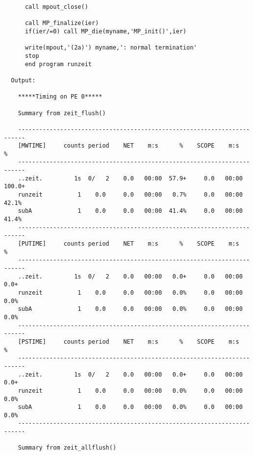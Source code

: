 \begin{verbatim}
      call mpout_close()

      call MP_finalize(ier)
      if(ier/=0) call MP_die(myname,'MP_init()',ier)

      write(mpout,'(2a)') myname,': normal termination'
      stop
      end program runzeit

  Output:

    *****Timing on PE 0*****

    Summary from zeit_flush()

    ------------------------------------------------------------------------
    [MWTIME]     counts period    NET    m:s      %    SCOPE    m:s      %
    ------------------------------------------------------------------------
    ..zeit.         1s  0/   2    0.0   00:00  57.9+     0.0   00:00 100.0+
    runzeit          1    0.0     0.0   00:00   0.7%     0.0   00:00  42.1%
    subA             1    0.0     0.0   00:00  41.4%     0.0   00:00  41.4%
    ------------------------------------------------------------------------
    [PUTIME]     counts period    NET    m:s      %    SCOPE    m:s      %
    ------------------------------------------------------------------------
    ..zeit.         1s  0/   2    0.0   00:00   0.0+     0.0   00:00   0.0+
    runzeit          1    0.0     0.0   00:00   0.0%     0.0   00:00   0.0%
    subA             1    0.0     0.0   00:00   0.0%     0.0   00:00   0.0%
    ------------------------------------------------------------------------
    [PSTIME]     counts period    NET    m:s      %    SCOPE    m:s      %
    ------------------------------------------------------------------------
    ..zeit.         1s  0/   2    0.0   00:00   0.0+     0.0   00:00   0.0+
    runzeit          1    0.0     0.0   00:00   0.0%     0.0   00:00   0.0%
    subA             1    0.0     0.0   00:00   0.0%     0.0   00:00   0.0%
    ------------------------------------------------------------------------
     
    Summary from zeit_allflush()


\end{verbatim}

